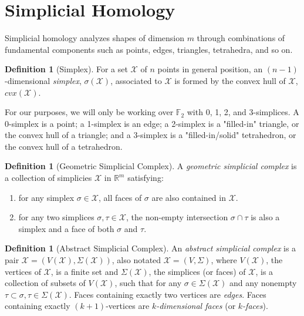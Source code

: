 \documentclass[ma]{uncgdissertationexp}
\theoremstyle{plain}
\theoremstyle{definition}
\newtheorem{definition}[theorem]{Definition}
\theoremstyle{remark}
\begin{document}
\section{Simplicial Homology}

\par Simplicial homology analyzes shapes of dimension $m$ through combinations of fundamental components such as points, edges, triangles, tetrahedra, and so on.

\begin{definition}[Simplex]
\par For a set $\mathcal{X}$ of $n$ points in general position, an $(n-1)$-dimensional \textit{simplex}, $\sigma(\mathcal{X})$, associated to $\mathcal{X}$ is formed by the convex hull of $\mathcal{X}$, $cvx(\mathcal{X})$.
\end{definition}

\par For our purposes, we will only be working over $\mathbb{F}_2$ with 0, 1, 2, and 3-simplices. A 0-simplex is a point; a 1-simplex is an edge; a 2-simplex is a "filled-in" triangle, or the convex hull of a triangle; and a 3-simplex is a "filled-in/solid" tetrahedron, or the convex hull of a tetrahedron.

\begin{definition}[Geometric Simplicial Complex]
\par A \textit{geometric simplicial complex} is a collection of simplicies $\mathcal{X}$ in $\mathbb{R}^m$ satisfying:
\begin{enumerate}
\item for any simplex $\sigma \in \mathcal{X}$, all faces of $\sigma$ are also contained in $\mathcal{X}$.
\item for any two simplices $\sigma, \tau \in \mathcal{X}$, the non-empty intersection $\sigma \cap \tau$ is also a simplex and a face of both $\sigma$ and $\tau$. 
\end{enumerate}
\end{definition}

\begin{definition}[Abstract Simplicial Complex]
\par An \textit{abstract simplicial complex} is a pair $\mathcal{X} = (V(\mathcal{X}), \Sigma(\mathcal{X}))$, also notated $\mathcal{X}=(V,\Sigma)$, where $V(\mathcal{X})$, the vertices of $\mathcal{X}$, is a finite set and $\Sigma(\mathcal{X})$, the simplices (or faces) of $\mathcal{X}$, is a collection of subsets of $V(\mathcal{X})$, such that for any $\sigma \in \Sigma(\mathcal{X})$ and any nonempty $\tau \subset \sigma, \tau \in \Sigma(\mathcal{X})$. Faces containing exactly two vertices are \textit{edges}. Faces containing exactly $(k+1)$-vertices are $k$\textit{-dimensional faces} (or $k$\textit{-faces}).
\end{definition}
\end{document}
